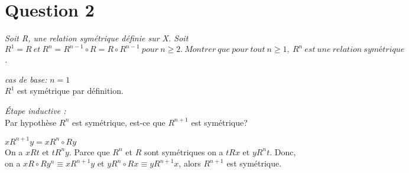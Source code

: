 \section*{Question 2}
\emph{Soit R, une relation symétrique définie sur X. Soit $R^1 = R\ et\ R^n = R^{n-1} \circ R = R \circ R^{n-1}\ pour\ n \geq 2.\ Montrer\ que\ pour\ tout\ n\geq1,\ R^n\ est\ une\ relation\ symétrique$.}

\bigskip

\emph{cas de base: }
$n = 1$\\
$R^1$ est symétrique par définition.

\bigskip

\emph{Étape inductive : }\\
Par hypothèse $R^n$ est symétrique, est-ce que $R^{n+1}$ est symétrique?
\bigskip

$xR^{n+1}y = xR^n \circ Ry$\\
On a $xRt$ et $tR^ny$. Parce que $R^n$ et $R$ sont symétriques on a $tRx$ et $yR^nt$. Donc, on a $xR \circ Ry^n \equiv xR^{n+1}y$ et $yR^n \circ Rx \equiv yR^{n+1}x$, alors $R^{n+1}$ est symétrique.